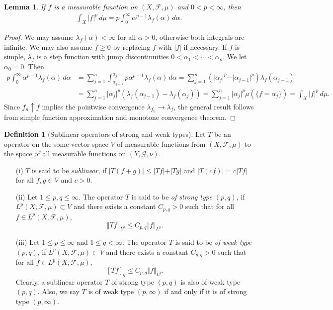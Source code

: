 \documentclass{article}
\numberwithin{equation}{section}
\newcommand{\scr}{\mathscr}
\theoremstyle{plain}
\newtheorem{lemma}[theorem]{Lemma}
\theoremstyle{definition}
\newtheorem{definition}[theorem]{Definition}
\begin{document}
\begin{lemma}\label{mckwzlemma1}
	If $f$ is a measurable function on $(X,\scr{F},\mu)$ and $0<p<\infty$, then
	\begin{align*}
		\int_X\vert f\vert^p\,d\mu=p\int_0^\infty\alpha^{p-1}\lambda_f(\alpha)\,d\alpha.
	\end{align*}
\end{lemma}
\begin{proof}
	We may assume $\lambda_f(\alpha)<\infty$ for all $\alpha>0$, otherwise both integrals are infinite. We may also assume $f\geq 0$ by replacing $f$ with $\vert f\vert$ if necessary. If $f$ is simple, $\lambda_f$ is a step function with jump discontinuities $0<\alpha_1<\cdots<\alpha_n$. We let $\alpha_0=0$. Then
	\begin{align*}
		p\int_0^\infty\alpha^{p-1}\lambda_f(\alpha)\,d\alpha&=\sum_{j=1}^n\int_{\alpha_{j-1}}^{\alpha_j} p\alpha^{p-1}\lambda_f(\alpha)\,d\alpha=\sum_{j=1}^n\left(\vert\alpha_j\vert^p-\vert\alpha_{j-1}\vert^p\right)\lambda_f(\alpha_{j-1})\\
		&=\sum_{j=1}^n\vert\alpha_j\vert^p\left(\lambda_f(\alpha_{j-1})-\lambda_f(\alpha_j)\right)=\sum_{j=1}^n\vert\alpha_j\vert^p\mu(\{f=\alpha_j\})=\int_X\vert f\vert^p\,d\mu.
	\end{align*}
	Since $f_n\uparrow f$ implies the pointwise convergence $\lambda_{f_n}\to\lambda_f$, the general result follows from simple function approximation and monotone convergence theorem.
\end{proof}

\begin{definition}[Sublinear operators of strong and weak types]
	Let $T$ be an operator on the some vector space $V$ of measurable functions from $(X,\scr{F},\mu)$ to the space of all measurable functions on $(Y,\scr{G},\nu)$. 
	\begin{itemize}
		\item[(i)] $T$ is said to be \textit{sublinear}, if $\vert T(f+g)\vert\leq\vert Tf\vert+\vert Tg\vert$ and $\vert T(cf)\vert=c\vert Tf\vert$ for all $f,g\in V$ and $c>0$.
		\item[(ii)] Let $1\leq p,q\leq\infty$. The operator $T$ is said to be \textit{of strong type $(p,q)$}, if $L^p(X,\scr{F},\mu)\subset V$ and there exists a constant $C_{p,q}>0$ such that for all $f\in L^p(X,\scr{F},\mu)$, $$\Vert Tf\Vert_{L^q}\leq C_{p,q}\Vert f\Vert_{L^p}.$$
		\item[(iii)] Let $1\leq p\leq\infty$ and $1\leq q<\infty$. The operator $T$ is said to be \textit{of weak type $(p,q)$}, if $L^p(X,\scr{F},\mu)\subset V$ and there exists a constant $C_{p,q}>0$  such that  for all $f\in L^p(X,\scr{F},\mu)$, 
		$$[Tf]_q\leq C_{p,q}\Vert f\Vert_{L^p}.$$ 
		Clearly, a sublinear operator $T$ of strong type $(p,q)$ is also of weak type $(p,q)$. Also, we say $T$ is of weak type $(p,\infty)$ if and only if it is of strong type $(p,\infty)$.
	\end{itemize}
\end{definition}
\end{document}
